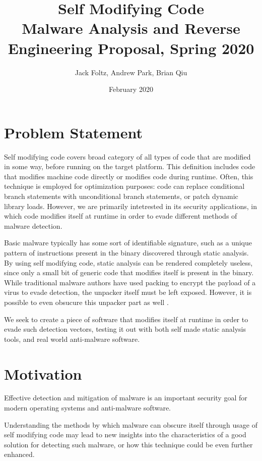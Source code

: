 \documentclass{article}
\title{Self Modifying Code \\ \small Malware Analysis and Reverse Engineering Proposal, Spring 2020}
\author{Jack Foltz, Andrew Park, Brian Qiu}
\date{February 2020}
\begin{document}
\maketitle


\section{Problem Statement}
Self modifying code covers broad category of all types of code that
are modified in some way, before running on the target platform. This
definition includes code that modifies machine code directly or
modifies code during runtime. Often, this technique is employed for
optimization purposes: code can replace conditional branch statements
with unconditional branch statements, or patch dynamic library loads.
However, we are primarily intetrested in its security applications, in
which code modifies itself at runtime in order to evade different
methods of malware detection.

Basic malware typically has some sort of identifiable signature, such
as a unique pattern of instructions present in the binary discovered
through static analysis. By using self modifying code, static analysis
can be rendered completely useless, since only a small bit of generic
code that modifies itself is present in the binary. While traditional
malware authors have used packing to encrypt the payload of a virus to
evade detection, the unpacker itself must be left exposed. However, it
is possible to even obsucure this unpacker part as well
\cite{cai2007certified}.

We seek to create a piece of software that modifies itself at runtime
in order to evade such detection vectors, testing it out with both
self made static analysis tools, and real world anti-malware software.


\section{Motivation}
Effective detection and mitigation of malware is an important security
goal for modern operating systems and anti-malware software.

Understanding the methods by which malware can obscure itself through
usage of self modifying code may lead to new insights into the
characteristics of a good solution for detecting such malware, or how
this technique could be even further enhanced.





\end{document}
